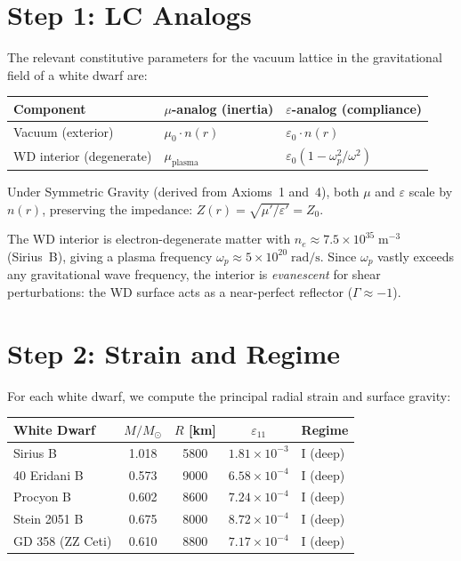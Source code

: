 \section{Step 1: LC Analogs}

The relevant constitutive parameters for the vacuum lattice
in the gravitational field of a white dwarf are:

\begin{center}
\begin{tabularx}{\textwidth}{@{}llX@{}}
\toprule
\textbf{Component} & \textbf{$\mu$-analog (inertia)} & \textbf{$\varepsilon$-analog (compliance)} \\
\midrule
Vacuum (exterior) & $\mu_0 \cdot n(r)$ & $\varepsilon_0 \cdot n(r)$ \\
WD interior (degenerate) & $\mu_{\text{plasma}}$ & $\varepsilon_0(1 - \omega_p^2 / \omega^2)$ \\
\bottomrule
\end{tabularx}
\end{center}

Under Symmetric Gravity (derived from Axioms~1 and~4), both $\mu$ and $\varepsilon$ scale by $n(r)$,
preserving the impedance: $Z(r) = \sqrt{\mu'/\varepsilon'} = Z_0$.

The WD interior is electron-degenerate matter with
$n_e \approx 7.5 \times 10^{35}\;\text{m}^{-3}$ (Sirius~B),
giving a plasma frequency $\omega_p \approx 5 \times 10^{20}\;\text{rad/s}$.
Since $\omega_p$ vastly exceeds any gravitational wave frequency,
the interior is \textit{evanescent} for shear perturbations:
the WD surface acts as a near-perfect reflector ($\Gamma \approx -1$\gammaundeclared{}).

\section{Step 2: Strain and Regime}

For each white dwarf, we compute the principal radial strain and surface gravity:

\begin{center}
\begin{tabularx}{\textwidth}{@{}lcccX@{}}
\toprule
\textbf{White Dwarf} & $M/M_\odot$ & $R$ [km] & $\varepsilon_{11}$ & \textbf{Regime} \\
\midrule
Sirius B          & 1.018 & 5800 & $1.81 \times 10^{-3}$ & I (deep) \\
40 Eridani B      & 0.573 & 9000 & $6.58 \times 10^{-4}$ & I (deep) \\
Procyon B         & 0.602 & 8600 & $7.24 \times 10^{-4}$ & I (deep) \\
Stein 2051 B      & 0.675 & 8000 & $8.72 \times 10^{-4}$ & I (deep) \\
GD 358 (ZZ Ceti)  & 0.610 & 8800 & $7.17 \times 10^{-4}$ & I (deep) \\
\bottomrule
\end{tabularx}
\end{center}

